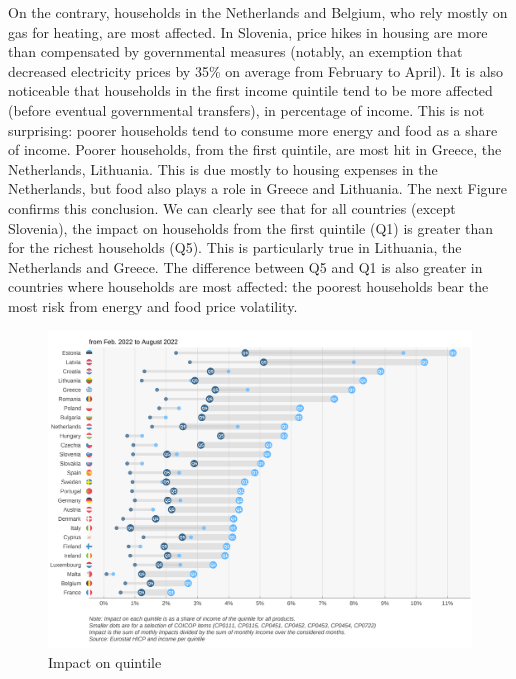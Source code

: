 \documentclass[
  9pt,
  a4paper,
  numbers=noendperiod,
  DIV=12]{scrartcl}
\begin{document}
On the contrary, households in the Netherlands and Belgium, who rely
mostly on gas for heating, are most affected. In Slovenia, price hikes
in housing are more than compensated by governmental measures (notably,
an exemption that decreased electricity prices by 35\% on average from
February to April). It is also noticeable that households in the first
income quintile tend to be more affected (before eventual governmental
transfers), in percentage of income. This is not surprising: poorer
households tend to consume more energy and food as a share of income.
Poorer households, from the first quintile, are most hit in Greece, the
Netherlands, Lithuania. This is due mostly to housing expenses in the
Netherlands, but food also plays a role in Greece and Lithuania. The
next Figure confirms this conclusion. We can clearly see that for all
countries (except Slovenia), the impact on households from the first
quintile (Q1) is greater than for the richest households (Q5). This is
particularly true in Lithuania, the Netherlands and Greece. The
difference between Q5 and Q1 is also greater in countries where
households are most affected: the poorest households bear the most risk
from energy and food price volatility.

\begin{figure}

\caption{Impact on quintile}

{\centering \includegraphics{../svg/quantiles1et5.png}

}

\end{figure}

\FloatBarrier
\end{document}
